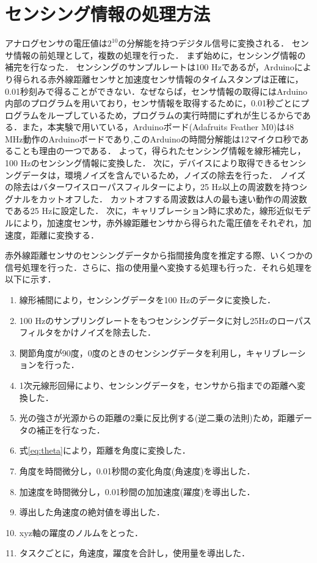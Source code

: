 \section{センシング情報の処理方法}
アナログセンサの電圧値は$2^{10}$の分解能を持つデジタル信号に変換される．
センサ情報の前処理として，複数の処理を行った．
まず始めに，センシング情報の補完を行なった．
センシングのサンプルレートは100 Hzであるが，Arduinoにより得られる赤外線距離センサと加速度センサ情報のタイムスタンプは正確に，0.01秒刻みで得ることができない．なぜならば，センサ情報の取得にはArduino内部のプログラムを用いており，センサ情報を取得するために，0.01秒ごとにプログラムをループしているため，プログラムの実行時間にずれが生じるからである．また，本実験で用いている，Arduinoボード(Adafruits Feather M0)は48 MHz動作のArduinoボードであり,このArduinoの時間分解能は12マイクロ秒であることも理由の一つである．
よって，得られたセンシング情報を線形補完し，100 Hzのセンシング情報に変換した．
次に，デバイスにより取得できるセンシングデータは，環境ノイズを含んでいるため，ノイズの除去を行った．
ノイズの除去はバターワイスローパスフィルターにより，25 Hz以上の周波数を持つシグナルをカットオフした．
カットオフする周波数は人の最も速い動作の周波数である25 Hz\cite{Friedman2014,VanGalen1990,Mason2001,Simone2007}に設定した．
次に，キャリブレーション時に求めた，線形近似モデルにより，加速度センサ，赤外線距離センサから得られた電圧値をそれぞれ，加速度，距離に変換する．



赤外線距離センサのセンシングデータから指間接角度を推定する際、いくつかの信号処理を行った．さらに、指の使用量へ変換する処理も行った．それら処理を以下に示す．

\begin{enumerate}
 \item 線形補間により，センシングデータを100 Hzのデータに変換した．
 \item 100 Hzのサンプリングレートをもつセンシングデータに対し25Hzのローパスフィルタをかけノイズを除去した．
 \item 関節角度が90度，0度のときのセンシングデータを利用し，キャリブレーションを行った．
 \item 1次元線形回帰により、センシングデータを，センサから指までの距離へ変換した．
 \item 光の強さが光源からの距離の2乗に反比例する(逆二乗の法則)ため，距離データの補正を行なった．
 \item 式\ref{eq:theta}により，距離を角度に変換した．
 \item 角度を時間微分し，0.01秒間の変化角度(角速度)を導出した．
 \item 加速度を時間微分し，0.01秒間の加加速度(躍度)を導出した．
 \item 導出した角速度の絶対値を導出した．
 \item xyz軸の躍度のノルムをとった．
 \item タスクごとに，角速度，躍度を合計し，使用量を導出した．
\end{enumerate}


